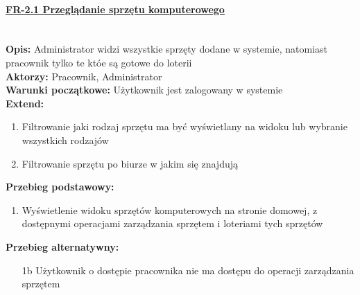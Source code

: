 \paragraph{\underline{FR-2.1 Przeglądanie sprzętu komputerowego}}\mbox{}\\[1mm]
	\noindent\textbf{Opis:} Administrator widzi wszystkie sprzęty dodane w systemie, natomiast pracownik tylko te któe są gotowe do loterii\\
	\noindent\textbf{Aktorzy:} Pracownik, Administrator\\
	\textbf{Warunki początkowe:} Użytkownik jest zalogowany w systemie\\
	\textbf{Extend:} 
	\begin{enumerate}[noparskip]
		\item Filtrowanie jaki rodzaj sprzętu ma być wyświetlany na widoku lub wybranie wszystkich rodzajów
		\item Filtrowanie sprzętu po biurze w jakim się znajdują
	\end{enumerate}
	\textbf{Przebieg podstawowy:}
	\begin{enumerate}[noparskip]
		\item Wyświetlenie widoku sprzętów komputerowych na stronie domowej, z dostępnymi operacjami zarządzania sprzętem i loteriami tych sprzętów
	\end{enumerate} 
	\textbf{Przebieg alternatywny:}
	\begin{enumerate}[noparskip]
		\item[1b] Użytkownik o dostępie pracownika nie ma dostępu do operacji zarządzania sprzętem
	\end{enumerate} 

